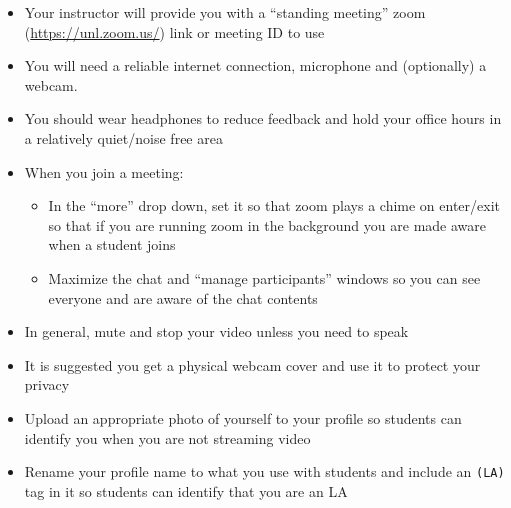 \documentclass[12pt]{scrartcl}
\begin{document}
\begin{itemize}
  \item Your instructor will provide you with a ``standing meeting'' 
  zoom (\url{https://unl.zoom.us/}) link or meeting ID to use 
  \item You will need a reliable internet connection, microphone and 
  (optionally) a webcam.
  \item You should wear headphones to reduce feedback and hold your 
  office hours in a relatively quiet/noise free area
  \item When you join a meeting:
  \begin{itemize} 
    \item In the ``more'' drop down, set it so that zoom plays a chime on 
    enter/exit so that if you are running zoom in the background you are 
    made aware when a student joins
    \item Maximize the chat and ``manage participants'' windows so you can 
    see everyone and are aware of the chat contents
  \end{itemize}
  \item In general, mute and stop your video unless you need to speak
  \item It is suggested you get a physical webcam cover and use it to protect your privacy
  \item Upload an appropriate photo of yourself to your profile so students can identify you when you are not streaming video
  \item Rename your profile name to what you use with students and include an \texttt{(LA)} tag in it so students can identify that you are an LA 


\end{itemize}
\end{document}
